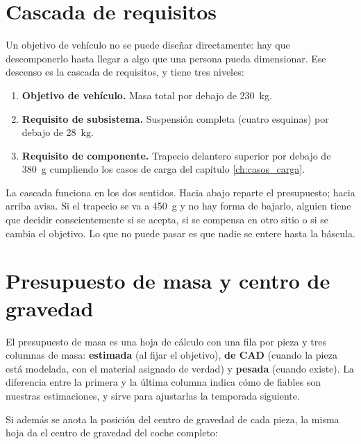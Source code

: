 \section{Cascada de requisitos}
\label{sec:coche_como_sistema:02}

Un objetivo de vehículo no se puede diseñar directamente: hay que descomponerlo
hasta llegar a algo que una persona pueda dimensionar. Ese descenso es la cascada
de requisitos, y tiene tres niveles:

\begin{enumerate}
  \item \textbf{Objetivo de vehículo.} Masa total por debajo de
        \SI{230}{\kilogram}.
  \item \textbf{Requisito de subsistema.} Suspensión completa (cuatro esquinas)
        por debajo de \SI{28}{\kilogram}.
  \item \textbf{Requisito de componente.} Trapecio delantero superior por debajo
        de \SI{380}{\gram} cumpliendo los casos de carga del capítulo
        \ref{ch:casos_carga}.
\end{enumerate}

La cascada funciona en los dos sentidos. Hacia abajo reparte el presupuesto; hacia
arriba avisa. Si el trapecio se va a \SI{450}{\gram} y no hay forma de bajarlo,
alguien tiene que decidir conscientemente si se acepta, si se compensa en otro
sitio o si se cambia el objetivo. Lo que no puede pasar es que nadie se entere
hasta la báscula.

\section{Presupuesto de masa y centro de gravedad}
\label{sec:coche_como_sistema:03}

El presupuesto de masa es una hoja de cálculo con una fila por pieza y tres
columnas de masa: \textbf{estimada} (al fijar el objetivo), \textbf{de CAD}
(cuando la pieza está modelada, con el material asignado de verdad) y
\textbf{pesada} (cuando existe). La diferencia entre la primera y la última
columna indica cómo de fiables son nuestras estimaciones, y sirve para ajustarlas
la temporada siguiente.

Si además se anota la posición del centro de gravedad de cada pieza, la misma
hoja da el centro de gravedad del coche completo:

